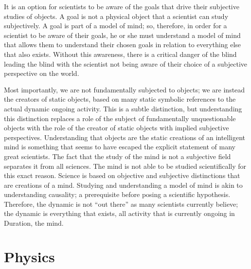 It is an option for scientists to be aware of the goals that drive
their subjective studies of objects.  A goal is not a physical object
that a scientist can study subjectively.  A goal is part of a model of
mind; so, therefore, in order for a scientist to be aware of their
goals, he or she must understand a model of mind that allows them to
understand their chosen goals in relation to everything else that also
exists.  Without this awareness, there is a critical danger of the
blind leading the blind with the scientist not being aware of their
choice of a subjective perspective on the world.

  Most importantly, we are
not fundamentally subjected to objects; we are instead the creators of
static objects, based on many static symbolic references to the actual
dynamic ongoing activity.  This is a subtle distinction, but
understanding this distinction replaces a role of the subject of
fundamentally unquestionable objects with the role of the creator of
static objects with implied subjective perspectives.  Understanding
that objects are the static creations of an intelligent mind is
something that seems to have escaped the explicit statement of many
great scientists.  The fact that the study of the mind is not a
subjective field separates it from all sciences.  The mind is not able
to be studied scientifically for this exact reason.  Science is based
on objective and subjective distinctions that are creations of a mind.
Studying and understanding a model of mind is akin to understanding
causality; a prerequisite before posing a scientific hypothesis.
Therefore, the dynamic is not ``out there'' as many scientists
currently believe; the dynamic is everything that exists, all activity
that is currently ongoing in Duration, the mind.

\section{Physics}


